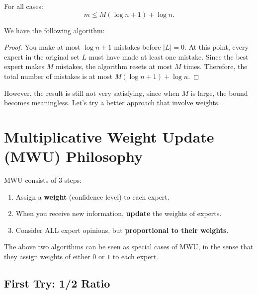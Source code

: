 \begin{theorem}
	For all cases:
	\[ m\leq M(\log n + 1) + \log n. \]
\end{theorem}

\pagebreak

We have the following algorithm:
\begin{algorithm}
	\caption{Resetting Expert Algorithm}
\end{algorithm}

\begin{proof}
	You make at most $\log n + 1$ mistakes before $|L| = 0$. At this point, every expert in the original set $L$ must have made at least one mistake. Since the best expert makes $M$ mistakes, the algorithm resets at most $M$ times. Therefore, the total number of mistakes is at most $M(\log n + 1) + \log n$.
\end{proof}

However, the result is still not very satisfying, since when $M$ is large, the bound becomes meaningless. Let's try a better approach that involve weights.

\section{Multiplicative Weight Update (MWU) Philosophy}

\begin{definition}
	MWU consists of 3 steps:
	\begin{enumerate}
		\item Assign a \textbf{weight} (confidence level) to each expert.
		\item When you receive new information, \textbf{update} the weights of experts.
		\item Consider ALL expert opinions, but \textbf{proportional to their weights}.
	\end{enumerate}
\end{definition}
\begin{remark}
	The above two algorithms can be seen as special cases of MWU, in the sense that they assign weights of either $0$ or $1$ to each expert.
\end{remark}

\subsection{First Try: 1/2 Ratio}

